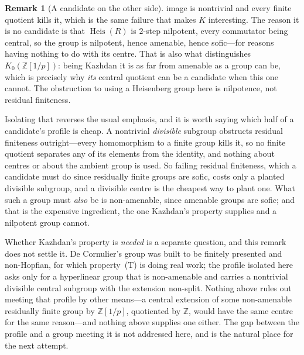\documentclass[11pt]{amsart}
\theoremstyle{definition}
\newtheorem{remark}[theorem]{Remark}
\theoremstyle{plain}
\newcommand{\Z}{\mathbb Z}
\newcommand{\Heis}{\operatorname{Heis}}
\begin{document}
\begin{remark}[A candidate on the other side]
image is nontrivial and every finite quotient kills it, which is the same failure that makes \(K\) interesting.  The reason it is no candidate is that \(\Heis(R)\) is \(2\)-step nilpotent, every commutator being central, so the group is nilpotent, hence amenable, hence sofic---for reasons having nothing to do with its centre.  That is also what distinguishes \(K_0(\Z[1/p])\): being Kazhdan it is as far from amenable as a group can be, which is precisely why \emph{its} central quotient can be a candidate when this one cannot.  The obstruction to using a Heisenberg group here is nilpotence, not residual finiteness.

Isolating that reverses the usual emphasis, and it is worth saying which half of a candidate's profile is cheap.  A nontrivial \emph{divisible} subgroup obstructs residual finiteness outright---every homomorphism to a finite group kills it, so no finite quotient separates any of its elements from the identity, and nothing about centres or about the ambient group is used.  So failing residual finiteness, which a candidate must do since residually finite groups are sofic, costs only a planted divisible subgroup, and a divisible centre is the cheapest way to plant one.  What such a group must \emph{also} be is non-amenable, since amenable groups are sofic; and that is the expensive ingredient, the one Kazhdan's property supplies and a nilpotent group cannot.

Whether Kazhdan's property is \emph{needed} is a separate question, and this remark does not settle it.  De Cornulier's group was built to be finitely presented and non-Hopfian, for which property~(T) is doing real work; the profile isolated here asks only for a hyperlinear group that is non-amenable and carries a nontrivial divisible central subgroup with the extension non-split.  Nothing above rules out meeting that profile by other means---a central extension of some non-amenable residually finite group by \(\Z[1/p]\), quotiented by \(\Z\), would have the same centre for the same reason---and nothing above supplies one either.  The gap between the profile and a group meeting it is not addressed here, and is the natural place for the next attempt.


\end{remark}
\end{document}
